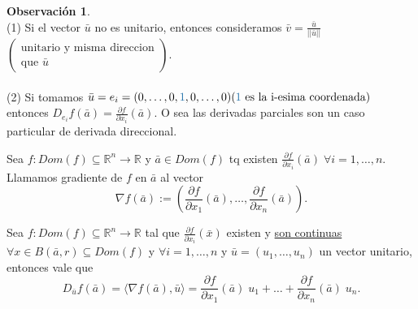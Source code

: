 \documentclass{article}
\theoremstyle{definition}
\newtheorem*{obs}{Observación}
\theoremstyle{remark}
\begin{document}
\begin{obs}
  \;\\
  \textcolor{verdep2}{(1)} Si el vector $\bar{u}$ no es unitario, entonces consideramos $\bar{v}=\frac{\bar{u}}{||\bar{u}||}$ $\left(\begin{array}{c}
      \text{unitario y misma direccion} \\
      \text{que } \bar{u}
  \end{array}\right)$. \\\\
  \textcolor{verdep2}{(2)} Si tomamos $\bar{u}=e_i=(0,\dots,0,\textcolor{azulp2}{1},0,\dots,0) (\textcolor{azulp2}{1} \text{ es la i-esima coordenada})$ entonces $D_{e_i}f(\bar{a})=\frac{\partial f}{\partial x_i}(\bar{a})$. O sea las derivadas parciales son un caso particular de derivada direccional. 
\end{obs}
\begin{defi}
  Sea $f : Dom(f) \subseteq \mathbb{R}^n \to \mathbb{R}$ y $\bar{a} \in Dom(f)$ tq existen $\frac{\partial f}{\partial x_i}(\bar{a}) \; \forall i=1,\dots,n$. Llamamos gradiente de $f$ en $\bar{a}$ al vector \[
    \nabla f(\bar{a}):=\left(\frac{\partial f}{\partial x_1}(\bar{a}), \dots ,\frac{\partial f }{\partial x_n}(\bar{a})\right).
  \]
\end{defi}
\begin{teo}
  Sea $f: Dom(f) \subseteq \mathbb{R}^n \to \mathbb{R}$ tal que $\frac{\partial f}{\partial x_i}(\bar{x})$ existen y \underline{son continuas} $\forall x \in B(\bar{a},r) \subseteq Dom(f)$ y $\forall i =1, \dots, n$ y $\bar{u}=(u_1,\dots,u_n)$ un vector unitario, entonces vale que \[
    D_{\bar{u}}f(\bar{a}) = \big\langle \nabla f(\bar{a}),\bar{u}\big\rangle = \frac{\partial f}{\partial x_1}(\bar{a})\; u_1 + \dots + \frac{\partial f}{\partial x_n}(\bar{a}) \; u_n.
  \]
\end{teo}\pagebreak
\end{document}
